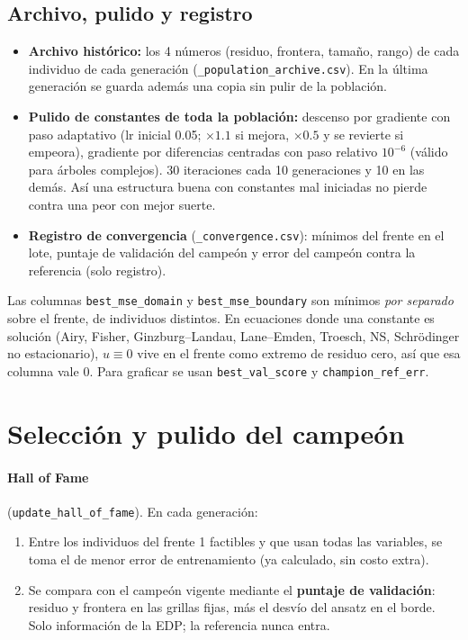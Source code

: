 \documentclass[11pt,a4paper]{article}
\newcommand{\code}[1]{\texttt{\small #1}}
\newcommand{\nota}[1]{\par\smallskip\noindent\colorbox{boxbg}{\parbox{\dimexpr\linewidth-2\fboxsep}{\small #1}}\par\smallskip}
\begin{document}
\subsection{Archivo, pulido y registro}
\begin{itemize}
\item \textbf{Archivo histórico:} los 4 números (residuo, frontera, tamaño, rango) de cada individuo de
  cada generación (\code{*\_population\_archive.csv}). En la última generación se guarda además una
  copia sin pulir de la población.
\item \textbf{Pulido de constantes de toda la población:} descenso por gradiente con paso adaptativo
  (lr inicial 0.05; $\times1.1$ si mejora, $\times0.5$ y se revierte si empeora), gradiente por
  diferencias centradas con paso relativo $10^{-6}$ (válido para árboles complejos). 30 iteraciones cada
  10 generaciones y 10 en las demás. Así una estructura buena con constantes mal iniciadas no pierde
  contra una peor con mejor suerte.
\item \textbf{Registro de convergencia} (\code{*\_convergence.csv}): mínimos del frente en el lote,
  puntaje de validación del campeón y error del campeón contra la referencia (solo registro).
\end{itemize}

\nota{Las columnas \code{best\_mse\_domain} y \code{best\_mse\_boundary} son mínimos \emph{por separado}
sobre el frente, de individuos distintos. En ecuaciones donde una constante es solución (Airy, Fisher,
Ginzburg--Landau, Lane--Emden, Troesch, NS, Schrödinger no estacionario), $u\equiv0$ vive en el frente
como extremo de residuo cero, así que esa columna vale 0. Para graficar se usan
\code{best\_val\_score} y \code{champion\_ref\_err}.}

\section{Selección y pulido del campeón}\label{sec:campeon}

\paragraph{Hall of Fame} (\code{update\_hall\_of\_fame}). En cada generación:
\begin{enumerate}
\item Entre los individuos del frente 1 factibles y que usan todas las variables, se toma el de menor
  error de entrenamiento (ya calculado, sin costo extra).
\item Se compara con el campeón vigente mediante el \textbf{puntaje de validación}: residuo y frontera en
  las grillas fijas, más el desvío del ansatz en el borde. Solo información de la EDP; la referencia
  nunca entra.
\end{enumerate}
\end{document}

